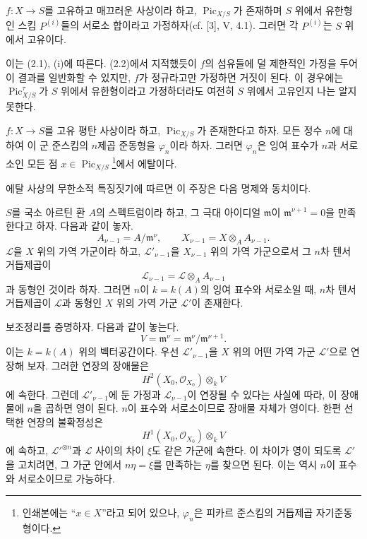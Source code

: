  $f:X\longrightarrow S$를 고유하고 매끄러운
사상이라 하고, $\operatorname{Pic}_{X/S}$가 존재하며 $S$ 위에서 유한형인
스킴 $P^{(i)}$들의 서로소 합이라고 가정하자(cf. [3], V, 4.1). 그러면 각
$P^{(i)}$는 $S$ 위에서 고유이다.

이는 (2.1), (i)에 따른다. (2.2)에서 지적했듯이 $f$의 섬유들에 덜 제한적인
가정을 두어 이 결과를 일반화할 수 있지만, $f$가 정규라고만 가정하면 거짓이
된다. 이 경우에는 $\operatorname{Pic}_{X/S}^\tau$가 $S$ 위에서 유한형이라고
가정하더라도 여전히 $S$ 위에서 고유인지 나는 알지 못한다.

 $f:X\longrightarrow S$를 고유 평탄 사상이라 하고,
$\operatorname{Pic}_{X/S}$가 존재한다고 하자. 모든 정수 $n$에 대하여 이
군 준스킴의 $n$제곱 준동형을 $\varphi_n$이라 하자. 그러면 $\varphi_n$은
잉여 표수가 $n$과 서로소인 모든 점
$x\in\operatorname{Pic}_{X/S}$\footnote{인쇄본에는 ``$x\in X$''라고
되어 있으나, $\varphi_n$은 피카르 준스킴의 거듭제곱 자기준동형이다.}에서
에탈이다.

에탈 사상의 무한소적 특징짓기에 따르면 이 주장은 다음 명제와 동치이다.

 $S$를 국소 아르틴 환 $A$의 스펙트럼이라 하고, 그
극대 아이디얼 $\mathfrak m$이 $\mathfrak m^{\nu+1}=0$을 만족한다고 하자.
다음과 같이 놓자.
\[
A_{\nu-1}=A/\mathfrak m^\nu,
\qquad X_{\nu-1}=X\otimes_A A_{\nu-1}.
\]
$\mathcal L$을 $X$ 위의 가역 가군이라 하고, $\mathcal L'_{\nu-1}$을
$X_{\nu-1}$ 위의 가역 가군으로서 그 $n$차 텐서 거듭제곱이
\[
\mathcal L_{\nu-1}=\mathcal L\otimes_A A_{\nu-1}
\]
과 동형인 것이라 하자. 그러면 $n$이 $k=k(A)$의 잉여 표수와 서로소일 때,
$n$차 텐서 거듭제곱이 $\mathcal L$과 동형인 $X$ 위의 가역 가군
$\mathcal L'$이 존재한다.

보조정리를 증명하자. 다음과 같이 놓는다.
\[
V=\mathfrak m^\nu=\mathfrak m^\nu/\mathfrak m^{\nu+1}.
\]
이는 $k=k(A)$ 위의 벡터공간이다. 우선 $\mathcal L'_{\nu-1}$을 $X$ 위의
어떤 가역 가군 $\mathcal L'$으로 연장해 보자. 그러한 연장의 장애물은
\[
H^2(X_0,\mathcal O_{X_0})\otimes_k V
\]
에 속한다. 그런데 $\mathcal L'_{\nu-1}$에 둔 가정과
$\mathcal L_{\nu-1}$이 연장될 수 있다는 사실에 따라, 이 장애물에 $n$을
곱하면 영이 된다. $n$이 표수와 서로소이므로 장애물 자체가 영이다. 한편
선택한 연장의 불확정성은
\[
H^1(X_0,\mathcal O_{X_0})\otimes_k V
\]
에 속하고, $\mathcal L'^{\otimes n}$과 $\mathcal L$ 사이의 차이 $\xi$도
같은 가군에 속한다. 이 차이가 영이 되도록 $\mathcal L'$을 고치려면, 그
가군 안에서 $n\eta=\xi$를 만족하는 $\eta$를 찾으면 된다. 이는 역시 $n$이
표수와 서로소이므로 가능하다.

